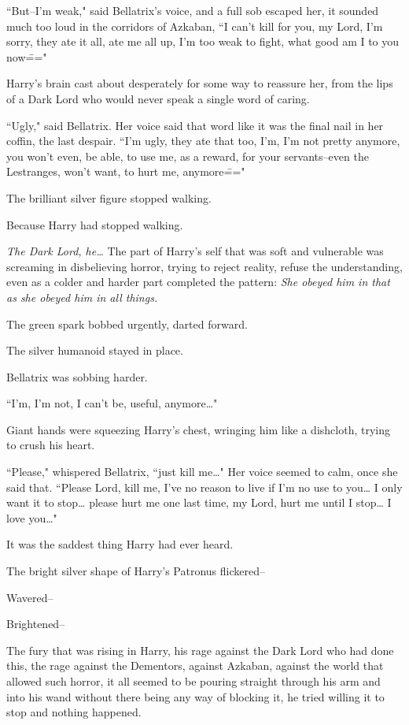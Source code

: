``But\---I'm weak," said Bellatrix's voice, and a full sob escaped her, it sounded much too loud in the corridors of Azkaban, ``I can't kill for you, my Lord, I'm sorry, they ate it all, ate me all up, I'm too weak to fight, what good am I to you now\==="

Harry's brain cast about desperately for some way to reassure her, from the lips of a Dark Lord who would never speak a single word of caring.

``Ugly," said Bellatrix. Her voice said that word like it was the final nail in her coffin, the last despair. ``I'm ugly, they ate that too, I'm, I'm not pretty anymore, you won't even, be able, to use me, as a reward, for your servants\---even the Lestranges, won't want, to hurt me, anymore\==="

The brilliant silver figure stopped walking.

Because Harry had stopped walking.

\emph{The Dark Lord, he{\ldots}} The part of Harry's self that was soft and vulnerable was screaming in disbelieving horror, trying to reject reality, refuse the understanding, even as a colder and harder part completed the pattern: \emph{She obeyed him in that as she obeyed him in all things.}

The green spark bobbed urgently, darted forward.

The silver humanoid stayed in place.

Bellatrix was sobbing harder.

``I'm, I'm not, I can't be, useful, anymore{\ldots}"

Giant hands were squeezing Harry's chest, wringing him like a dishcloth, trying to crush his heart.

``Please," whispered Bellatrix, ``just kill me{\ldots}" Her voice seemed to calm, once she said that. ``Please Lord, kill me, I've no reason to live if I'm no use to you{\ldots} I only want it to stop{\ldots} please hurt me one last time, my Lord, hurt me until I stop{\ldots} I love you{\ldots}"

It was the saddest thing Harry had ever heard.

The bright silver shape of Harry's Patronus flickered\---

Wavered\---

Brightened\---

The fury that was rising in Harry, his rage against the Dark Lord who had done this, the rage against the Dementors, against Azkaban, against the world that allowed such horror, it all seemed to be pouring straight through his arm and into his wand without there being any way of blocking it, he tried willing it to stop and nothing happened.

